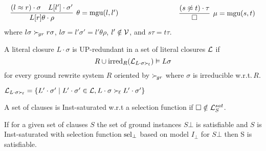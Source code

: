 



\begin{definition}
\begin{gather*}
        \infer[\theta=\mgu(l,l')]
        {L[r]\theta\cdot\rho}
        {(l\mEQ r)\cdot\sigma & L[l']\cdot\sigma'}
        \hspace{3cm}
        \infer[\mu=\mgu(s,t)]
        {\emptyclause}
        {(s\mNE t)\cdot\tau}
\end{gather*}
where
    $l\sigma\mathrel\succ_{\!gr} r\sigma$,
    $l\sigma = l'\sigma' = l'\theta\rho$,
    $l'\notin\mathcal{V}$,
    and
    $s\tau = t\tau$.
\end{definition}

\begin{definition}
    A literal closure $L\cdot\sigma$ is {\myem UP-redundant} in a set of literal closures $\mathcal{L}$
    if
    \[
        R \cup \operatorname{irred}_R(\mathcal{L}_{L\cdot\sigma\mathrel\succ_{\!\ell}}) \vDash L\sigma
    \]
    for every ground rewrite system $R$ oriented by $\mathrel\succ_{\!gr}$
    where $\sigma$ is irreducible w.r.t.\,$R$.

    $\mathcal{L}_{L\cdot\sigma\mathrel\succ_{\!\ell}} = \{
        L'\cdot\sigma'\mid L'\cdot\sigma'\in\mathcal{L}, L\cdot\sigma\mathrel\succ_{\!\ell} L'\cdot\sigma'
    \}$
\end{definition}

\begin{definition}
    A set of clauses is Inst-saturated w.r.t a selection function if
    $\square\notin\mathcal{L}_S^{sat}$.
\end{definition}

\begin{theorem}
    If for a given set of clauses $S$
    the set of ground instances $S\bot$ is satisfiable
    and $S$ is Inst-saturated
    with selection function $\operatorname{sel}_\bot$ based
    on model $I_\bot$ for $S\bot$
    then S is satisfiable.
\end{theorem}

